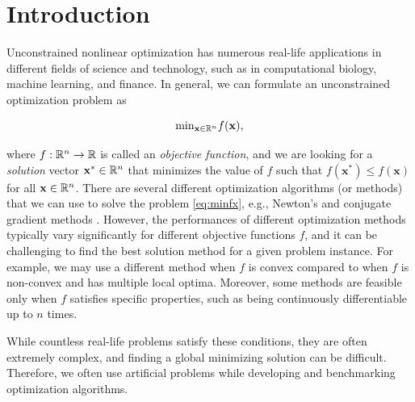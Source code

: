 \documentclass[english, 12pt, a4paper, sci, utf8, a-1b, online, table]{aaltothesis}
\newcommand{\vect}[1]{\ensuremath{\mathbf{#1}}}
\newcommand{\R}{\ensuremath\mathbb{R}}
\begin{document}
\newpage


\pagestyle{fancy}

\fancyhf{}
\renewcommand{\headrulewidth}{0pt}
\renewcommand{\footrulewidth}{0pt}

\rhead{\footnotesize \thepage} 

\thispagestyle{empty} 


\section{Introduction}

Unconstrained nonlinear optimization has numerous real-life applications in different fields of science and technology, such as in computational biology, machine learning, and finance.
In general, we can formulate an unconstrained optimization problem as

\begin{equation}\label{eq:minfx}
    \mathrm{min}_{\vect{x} \in \R^n} f(\vect{x}),
\end{equation}

where $f : \R^n \rightarrow \R$ is called an \emph{objective function}, and we are looking for a \emph{solution} vector $\vect{x}^* \in \R^n$ that minimizes the value of $f$ such that $f(\vect{x}^*) \leq f(\vect{x})$ for all $\vect{x}\in \R^n$. There are several different optimization algorithms (or methods) that we can use to solve the problem \eqref{eq:minfx}, e.g., Newton's and conjugate gradient methods \cite{book:nonlinear_programming}. However, the performances of different optimization methods typically vary significantly for different objective functions $f$, and it can be challenging to find the best solution method for a given problem instance. For example, we may use a different method when $f$ is convex compared to when $f$ is non-convex and has multiple local optima. Moreover, some methods are feasible only when $f$ satisfies specific properties, such as being continuously differentiable up to $n$ times.

While countless real-life problems satisfy these conditions, they are often extremely complex, and finding a global minimizing solution can be difficult.
Therefore, we often use artificial problems while developing and benchmarking optimization algorithms. \cite{test_function_collection_artifical}
\end{document}
